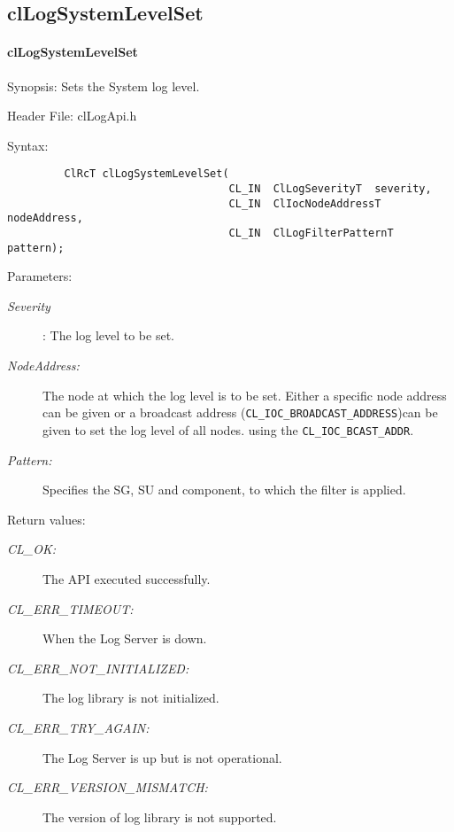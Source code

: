 \subsection{clLogSystemLevelSet}
\hypertarget{pagelog108}{}\paragraph{cl\-Log\-System\-Level\-Set}\label{pagelog108}
\begin{Desc}
\item[Synopsis:]Sets the System log level.\end{Desc}
\begin{Desc}
\item[Header File:]clLogApi.h\end{Desc}
\begin{Desc}
\item[Syntax:]

\footnotesize\begin{verbatim}         ClRcT clLogSystemLevelSet(
                                   CL_IN  ClLogSeverityT  severity,
                                   CL_IN  ClIocNodeAddressT   nodeAddress,
                                   CL_IN  ClLogFilterPatternT pattern);
\end{verbatim}
\normalsize
\end{Desc}
\begin{Desc}
\item[Parameters:]
\begin{description}
\item[{\em Severity}]: The log level to be set. \item[{\em Node\-Address:}]The node at which the log level is to be set. Either a specific node address can be given or a broadcast address ({\tt CL\_\-IOC\_\-BROADCAST\_\-ADDRESS})can be given to set the log level of all nodes. using the {\tt CL\_\-IOC\_\-BCAST\_\-ADDR}. \item[{\em Pattern:}]Specifies the SG, SU and component, to which the filter is applied.\end{description}
\end{Desc}
\begin{Desc}
\item[Return values:]
\begin{description}
\item[{\em CL\_\-OK:}]The API executed successfully. \item[{\em CL\_\-ERR\_\-TIMEOUT:}]When the Log Server is down. \item[{\em CL\_\-ERR\_\-NOT\_\-INITIALIZED:}]The log library is not initialized. \item[{\em CL\_\-ERR\_\-TRY\_\-AGAIN:}]The Log Server is up but is not operational. \item[{\em CL\_\-ERR\_\-VERSION\_\-MISMATCH:}]The version of log library is not supported.\end{description}
\end{Desc}
